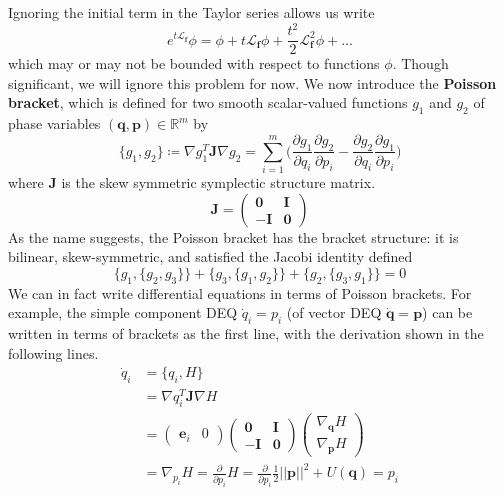 \documentclass{article}
\begin{document}
      Ignoring the initial term in the Taylor series allows us write 
      \begin{equation}
        e^{t \mathcal{L}_\mathbf{f}} \phi = \phi + t \mathcal{L}_\mathbf{f} \phi + \frac{t^2}{2} \mathcal{L}_\mathbf{f}^2 \phi + \ldots
      \end{equation}
      which may or may not be bounded with respect to functions $\phi$. Though significant, we will ignore this problem for now. We now introduce the \textbf{Poisson bracket}, which is defined for two smooth scalar-valued functions $g_1$ and $g_2$ of phase variables $(\mathbf{q}, \mathbf{p}) \in \mathbb{R}^m$ by 
      \begin{equation}
        \{g_1, g_2\} \coloneqq \nabla g_1^T \mathbf{J} \nabla g_2 = \sum_{i=1}^m \bigg( \frac{\partial g_1}{\partial q_i} \frac{\partial g_2}{\partial p_i} - \frac{ \partial g_2}{\partial q_i} \frac{\partial g_1}{\partial p_i} \bigg)
      \end{equation}
      where $\mathbf{J}$ is the skew symmetric symplectic structure matrix.
      \begin{equation}
        \mathbf{J} = \begin{pmatrix} \mathbf{0} & \mathbf{I} \\ -\mathbf{I} & \mathbf{0} \end{pmatrix}
      \end{equation}
      As the name suggests, the Poisson bracket has the bracket structure: it is bilinear, skew-symmetric, and satisfied the Jacobi identity defined 
      \begin{equation}
        \{ g_1, \{g_2, g_3\} \} + \{g_3, \{ g_1, g_2\}\} + \{g_2, \{g_3, g_1\}\} = 0
      \end{equation}
      We can in fact write differential equations in terms of Poisson brackets. For example, the simple component DEQ $\dot{q}_i = p_i$ (of vector DEQ $\mathbf{\dot{q}} = \mathbf{p}$) can be written in terms of brackets as the first line, with the derivation shown in the following lines. 
      \begin{align*}
        \dot{q}_i & = \{q_i, H\} \\
        & = \nabla q_i^T \mathbf{J} \nabla H \\
        & = \begin{pmatrix}
        \mathbf{e}_i & 0 
        \end{pmatrix} \begin{pmatrix}
        \mathbf{0} & \mathbf{I} \\ -\mathbf{I} & \mathbf{0} 
        \end{pmatrix} \begin{pmatrix}
        \nabla_\mathbf{q} H \\ \nabla_\mathbf{p} H 
        \end{pmatrix} \\
        & = \nabla_{p_i} H = \frac{\partial}{\partial p_i} H = \frac{\partial}{\partial p_i} \frac{1}{2} ||\mathbf{p}||^2 + U(\mathbf{q}) = p_i
      \end{align*}
\end{document}
